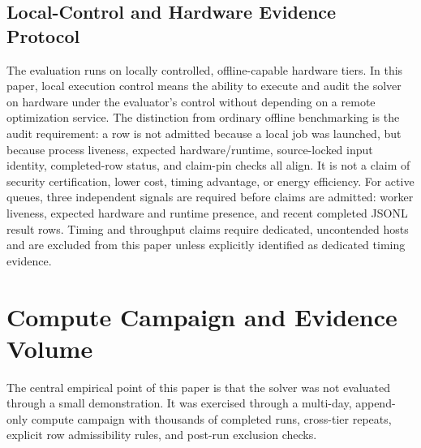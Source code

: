 \documentclass[11pt]{article}
\begin{document}
\subsection{Local-Control and Hardware Evidence Protocol}
The evaluation runs on locally controlled, offline-capable hardware tiers. In this paper, local execution control means the ability to execute and audit the solver on hardware under the evaluator's control without depending on a remote optimization service. The distinction from ordinary offline benchmarking is the audit requirement: a row is not admitted because a local job was launched, but because process liveness, expected hardware/runtime, source-locked input identity, completed-row status, and claim-pin checks all align. It is not a claim of security certification, lower cost, timing advantage, or energy efficiency. For active queues, three independent signals are required before claims are admitted: worker liveness, expected hardware and runtime presence, and recent completed JSONL result rows. Timing and throughput claims require dedicated, uncontended hosts and are excluded from this paper unless explicitly identified as dedicated timing evidence.

\section{Compute Campaign and Evidence Volume}
The central empirical point of this paper is that the solver was not evaluated through a small demonstration. It was exercised through a multi-day, append-only compute campaign with thousands of completed runs, cross-tier repeats, explicit row admissibility rules, and post-run exclusion checks.
\end{document}
